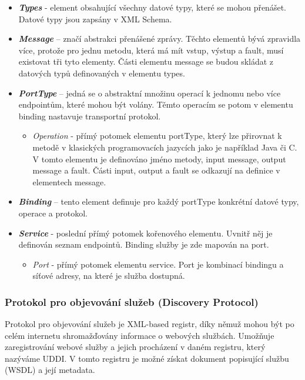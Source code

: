 \documentclass[11pt,twoside,a4paper]{book}
\begin{document}
\begin{itemize}
  \item \textbf{\textit{Types}} - element obsahující všechny datové typy,
  které se mohou přenášet. Datové typy jsou zapsány v XML Schema.

  \item \textbf{\textit{Message}} – značí abstrakci přenášené zprávy.
  Těchto elementů bývá zpravidla více, protože pro jednu metodu, která má mít vstup, výstup a fault, musí existovat tři tyto
elementy. Části elementu message se budou skládat z datových typů definovaných v
 elementu types. 

  \item \textbf{\textit{PortType}} – jedná se o abstraktní množinu
  operací k jednomu nebo více endpointům, které mohou být volány. Těmto operacím se potom v elementu binding nastavuje
transportní protokol.

  \begin{itemize}
    \item \textit{Operation} - přímý potomek elementu portType,
    který lze přirovnat k metodě v klasických programovacích jazycích jako je například Java či C. V tomto
elementu je definováno jméno metody, input message, output message a fault.
Části input, output a fault se odkazují na definice v elementech message.

  \end{itemize}
  \item \textbf{\textit{Binding}} – tento element definuje pro každý
  portType konkrétní datové typy, operace a protokol.

  \item \textbf{\textit{Service}} - poslední přímý potomek kořenového
  elementu. Uvnitř něj je definován seznam endpointů. Binding služby je zde mapován na port.

  \begin{itemize}
    \item \textit{Port} - přímý potomek elementu service. Port je
    kombinací bindingu a síťové adresy, na které je služba dostupná.

  \end{itemize}
\end{itemize}

\subsubsection{Protokol pro objevování služeb (Discovery Protocol)}
Protokol pro objevování služeb je XML-based registr, díky němuž mohou být po celém
internetu shromažďovány informace o webových službách. Umožňuje zaregistrování webové
služby a jejich procházení v daném registru, který nazýváme UDDI. V tomto registru je
možné získat dokument popisující službu (WSDL) a její metadata.
\end{document}
